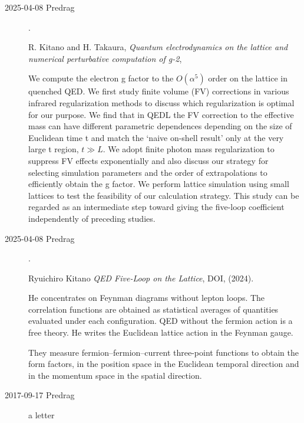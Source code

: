 \begin{description}
\item[2025-04-08 Predrag].

%
R. Kitano and H. Takaura, %
{\em Quantum electrodynamics on the lattice and numerical perturbative 
computation of g-2}, 

We compute the electron g factor to the  $O(\alpha^5)$ order on the 
lattice in quenched QED. We first study finite volume (FV) corrections in 
various infrared regularization methods to discuss which regularization 
is optimal for our purpose. We find that in QEDL the FV correction to the 
effective mass can have different parametric dependences depending on the 
size of Euclidean time t and match the ‘naive on-shell result’ only at 
the very large t region, $t \gg L$. We adopt finite photon mass 
regularization to suppress FV effects exponentially and also discuss our 
strategy for selecting simulation parameters and the order of 
extrapolations to efficiently obtain the g factor. We perform lattice 
simulation using small lattices to test the feasibility of our 
calculation strategy. This study can be regarded as an intermediate step 
toward giving the five-loop coefficient independently of preceding 
studies. 


\item[2025-04-08 Predrag].

Ryuichiro Kitano %
{\em QED Five-Loop on the Lattice},
 {DOI}, 
(2024).

He  concentrates on Feynman diagrams without lepton loops.
The correlation functions are 
obtained as statistical averages of quantities evaluated under each 
configuration. 
QED without the fermion action is a free theory. He writes the Euclidean lattice 
action in the Feynman gauge.

They measure fermion–fermion–current three-point functions to obtain the 
form factors, in the position space in the Euclidean temporal 
direction and in the momentum space in the spatial direction. 


\item[2017-09-17 Predrag]
a letter


\end{description}

